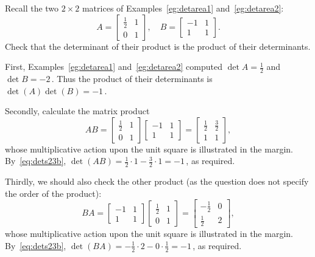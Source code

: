 \begin{example} \label{eg:}
Recall the two \(2\times2\) matrices of Examples~\ref{eg:detarea1} and~\ref{eg:detarea2}:
\begin{equation*}
A=\begin{bmatrix} \tfrac12&1\\0&1 \end{bmatrix},\quad
B=\begin{bmatrix} -1&1\\1&1 \end{bmatrix}.
\end{equation*}
Check that the determinant of their product is the product of their determinants. 
\begin{solution} 
First, Examples~\ref{eg:detarea1} and~\ref{eg:detarea2} computed \(\det A=\tfrac12\) and \(\det B=-2\)\,.
Thus the product of their determinants is \(\det(A)\det(B)=-1\)\,.

Secondly, calculate the matrix product
%
\begin{equation*}
AB=\begin{bmatrix} \tfrac12&1\\0&1 \end{bmatrix}
\begin{bmatrix} -1&1\\1&1 \end{bmatrix}
=\begin{bmatrix} \tfrac12&\tfrac32\\1&1 \end{bmatrix},
\end{equation*}
whose multiplicative action upon the unit square is illustrated in the margin.
By~\eqref{eq:dets23b}, \(\det(AB)=\frac12\cdot1-\frac32\cdot1=-1\)\,, as required.
 
Thirdly, we should also check the other product (as the question does not specify the order of the product):
%
\begin{equation*}
BA=\begin{bmatrix} -1&1\\1&1 \end{bmatrix}
\begin{bmatrix} \tfrac12&1\\0&1 \end{bmatrix}
=\begin{bmatrix} -\tfrac12&0\\\tfrac12&2 \end{bmatrix},
\end{equation*}
whose multiplicative action upon the unit square is illustrated in the margin.
By~\eqref{eq:dets23b}, \(\det(BA)=-\frac12\cdot2-0\cdot\frac12=-1\)\,, as required.
\end{solution}
\end{example}



